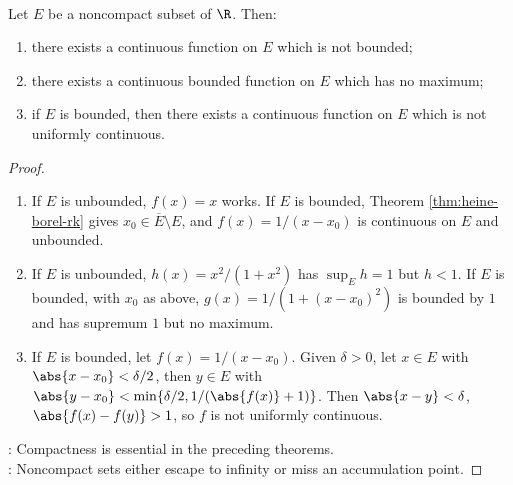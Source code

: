 \begin{theorem} \label{thm:compactness-hypotheses-are-essential} \\
Let $E$ be a noncompact subset of $\R$. Then:
\begin{enumerate}[label=(\roman*)]
\setlength{\itemsep}{0pt}
\item there exists a continuous function on $E$ which is not bounded;
\item there exists a continuous bounded function on $E$ which has no maximum;
\item if $E$ is bounded, then there exists a continuous function on $E$ which is not uniformly continuous.
\end{enumerate}
\begin{proof}
\begin{enumerate}[label=(\roman*)]
\setlength{\itemsep}{0pt}
\item If $E$ is unbounded, $f(x)=x$ works. If $E$ is bounded, Theorem \ref{thm:heine-borel-rk} gives $x_0\in\overline{E}\setminus E$, and $f(x)=1/(x-x_0)$ is continuous on $E$ and unbounded.
\item If $E$ is unbounded, $h(x)=x^2/(1+x^2)$ has $\sup_E h=1$ but $h<1$. If $E$ is bounded, with $x_0$ as above, $g(x)=1/(1+(x-x_0)^2)$ is bounded by $1$ and has supremum $1$ but no maximum.
\item If $E$ is bounded, let $f(x)=1/(x-x_0)$. Given $\delta>0$, let $x\in E$ with $\abs{x-x_0}<\delta/2$, then $y\in E$ with $\abs{y-x_0}<\min\{\delta/2,1/(\abs{f(x)}+1)\}$. Then $\abs{x-y}<\delta$, $\abs{f(x)-f(y)}>1$, so $f$ is not uniformly continuous.
\end{enumerate}
: Compactness is essential in the preceding theorems.\\
: Noncompact sets either escape to infinity or miss an accumulation point.
\end{proof}
\end{theorem}
